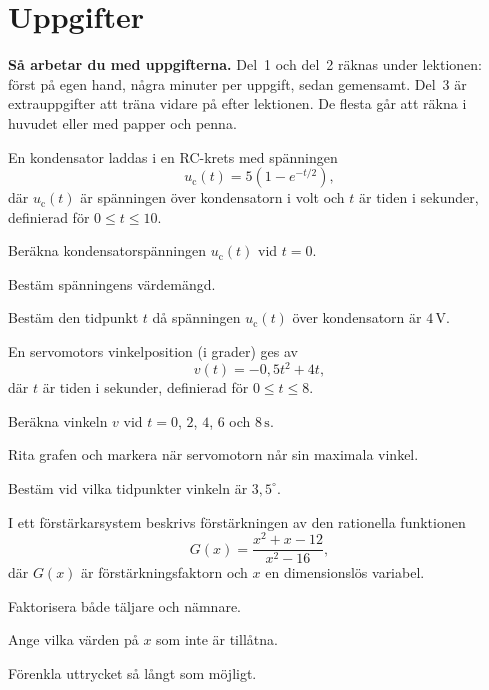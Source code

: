 
\section{Uppgifter}
\label{c9:sec:uppgifter}

\begin{aside}
\textbf{Så arbetar du med uppgifterna.} Del~1 och del~2 räknas under lektionen: först på egen
hand, några minuter per uppgift, sedan gemensamt. Del~3 är extrauppgifter att träna vidare på
efter lektionen. De flesta går att räkna i huvudet eller med papper och penna.

\end{aside}


En kondensator laddas i en RC-krets med spänningen
\[
  u_{\text{c}}(t) = 5\left(1 - e^{-t/2}\right),
\]
där $u_{\text{c}}(t)$ är spänningen över kondensatorn i volt och $t$ är tiden i sekunder,
definierad för $0 \leq t \leq 10$.
\begin{parts}
  \item Beräkna kondensatorspänningen $u_{\text{c}}(t)$ vid $t = 0$.
  \item Bestäm spänningens värdemängd.
  \item Bestäm den tidpunkt $t$ då spänningen $u_{\text{c}}(t)$ över kondensatorn är
    $4\,\text{V}$.
\end{parts}

En servomotors vinkelposition (i grader) ges av
\[
  v(t) = -0{,}5t^2 + 4t,
\]
där $t$ är tiden i sekunder, definierad för $0 \leq t \leq 8$.
\begin{parts}
  \item Beräkna vinkeln $v$ vid $t = 0$, $2$, $4$, $6$ och $8\,\text{s}$.
  \item Rita grafen och markera när servomotorn når sin maximala vinkel.
  \item Bestäm vid vilka tidpunkter vinkeln är $3{,}5^{\circ}$.
\end{parts}

I ett förstärkarsystem beskrivs förstärkningen av den rationella funktionen
\[
  G(x) = \frac{x^2 + x - 12}{x^2 - 16},
\]
där $G(x)$ är förstärkningsfaktorn och $x$ en dimensionslös variabel.
\begin{parts}
  \item Faktorisera både täljare och nämnare.
  \item Ange vilka värden på $x$ som inte är tillåtna.
  \item Förenkla uttrycket så långt som möjligt.
\end{parts}

